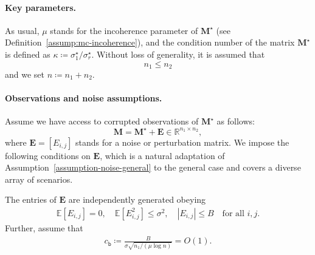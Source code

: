 \paragraph{Key parameters.}
As usual,  $\mu$ stands for the incoherence parameter  of  $\bm{M}^{\star}$ (see Definition~\ref{assump:mc-incoherence}),
and  the condition number of the matrix $\bm{M}^{\star}$ is defined as $\kappa\coloneqq  {\sigma_{1}^{\star}}/{\sigma_{r}^{\star}}$.
Without loss of generality, it is assumed that $$n_1 \leq n_2$$ and we set $n \coloneqq n_1 + n_2$.



\paragraph{Observations and noise assumptions. }
%
Assume we have access to corrupted observations of $\bm{M}^{\star}$ as follows:
%
\[
	\bm{M}=\bm{M}^{\star}+\bm{E}\in\mathbb{R}^{n_{1}\times n_{2}},
\]
%
where $\bm{E}=[E_{i,j}]$ stands for a  noise or perturbation matrix. We impose the following conditions on  $\bm{E}$, which is a natural
adaptation of Assumption~\ref{assumption-noise-general} to the general case and covers a diverse array of scenarios.

\begin{assumption}
\label{assump:noise-general-rect}
The entries of $\bm{E}$ are independently generated obeying
%
\begin{align}
	\mathbb{E}[E_{i,j}] = 0, \quad \mathbb{E}[E_{i,j}^2]\leq \sigma^2, \quad |E_{i,j}|\leq B \quad \text{for all }i, j.
\end{align}
%
	Further,  assume that
	\begin{align}
		c_{\mathsf{b}} \coloneqq \frac{B}{\sigma  \sqrt{n_1/(\mu\log n)}} = O(1).
	\end{align}\end{assumption}



